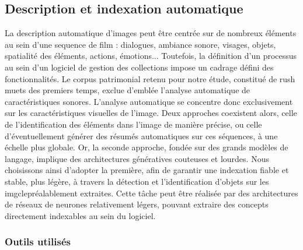 \subsection{Description et indexation automatique} 


La description automatique d’images peut être centrée sur de nombreux éléments au sein d'une \gls{sequence} de film : dialogues, ambiance sonore, visages, objets, spatialité des éléments, actions, émotions... Toutefois, la définition d’un processus au sein d’un logiciel de gestion des collections impose un cadrage défini des fonctionnalités. Le corpus patrimonial retenu pour notre étude, constitué de \gls{rush} muets des premiers temps, exclue d’emblée l’analyse automatique de caractéristiques sonores. L’analyse automatique se concentre donc exclusivement sur les caractéristiques visuelles de l’image. Deux approches coexistent alors, celle de l’identification des éléments dans l’image de manière précise, ou celle d’éventuellement générer des résumés automatiques sur ces séquences, à une échelle plus globale. Or, la seconde approche, fondée sur des grands modèles de langage, implique des architectures génératives couteuses et lourdes. Nous choisissons ainsi d’adopter la première, afin de garantir une indexation fiable et stable, plus légère, à travers la détection et l’identification d’objets sur les \gls{imgcle}préalablement extraites. Cette tâche peut être réalisée par des architectures de réseaux de neurones relativement légers, pouvant extraire des concepts directement indexables au sein du logiciel.  



\subsubsection{Outils utilisés}

